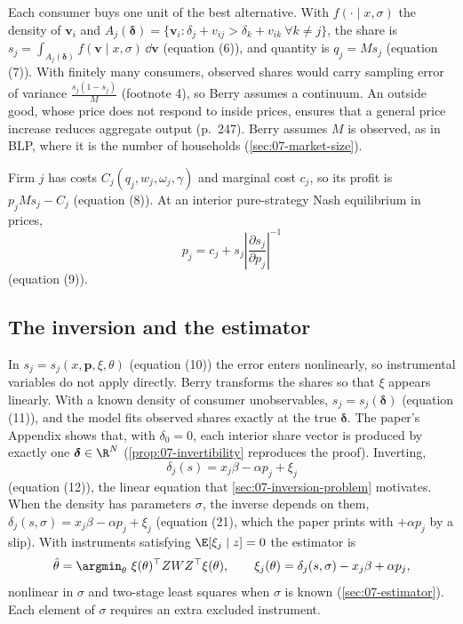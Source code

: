 Each consumer buys one unit of the best alternative. With $f(\cdot \mid x, \sigma)$ the density of
$\boldsymbol v_i$ and $A_j(\boldsymbol\delta) = \{\boldsymbol v_i : \delta_j + v_{ij} > \delta_k + v_{ik}\ \forall
k \ne j\}$, the share is $s_j = \int_{A_j(\boldsymbol\delta)} f(\boldsymbol v \mid x, \sigma)\,\dd\boldsymbol v$
(equation (6)), and quantity is $q_j = Ms_j$ (equation (7)). With finitely many consumers, observed shares
would carry sampling error of variance $\frac{s_j(1-s_j)}{M}$ (footnote 4), so Berry assumes a continuum. An
outside good, whose price does not respond to inside prices, ensures that a general price increase reduces
aggregate output (p.~247). Berry assumes $M$ is observed, as in BLP, where it is the number of households
(\cref{sec:07-market-size}).

Firm $j$ has costs $C_j(q_j, w_j, \omega_j, \gamma)$ and marginal cost $c_j$, so its profit is $p_jMs_j - C_j$
(equation (8)). At an interior pure-strategy Nash equilibrium in prices,
\begin{equation}\label{eq:07-berry-foc}
p_j = c_j + s_j\left|\frac{\partial s_j}{\partial p_j}\right|^{-1}
\end{equation}
(equation (9)).

\subsection{The inversion and the estimator}\label{sec:07-berry-inversion}

In $s_j = s_j(x, \boldsymbol p, \xi, \theta)$ (equation (10)) the error enters nonlinearly, so instrumental
variables do not apply directly. Berry transforms the shares so that $\xi$ appears linearly. With a known density
of consumer unobservables, $s_j = s_j(\boldsymbol\delta)$ (equation (11)), and the model fits observed shares
exactly at the true $\boldsymbol\delta$. The paper's Appendix shows that, with $\delta_0 = 0$, each interior share
vector is produced by exactly one $\boldsymbol\delta \in \R^N$ (\cref{prop:07-invertibility} reproduces the proof).
Inverting,
\begin{equation}\label{eq:07-berry-eq12}
\delta_j(s) = x_j\beta - \alpha p_j + \xi_j
\end{equation}
(equation (12)), the linear equation that \cref{sec:07-inversion-problem} motivates. When the density has
parameters $\sigma$, the
inverse depends on them, $\delta_j(s, \sigma) = x_j\beta - \alpha p_j + \xi_j$ (equation (21), which the paper
prints with $+\alpha p_j$ by a slip). With instruments satisfying $\E[\xi_j \mid z] = 0$ the estimator is
\begin{equation}\label{eq:07-berry-gmm}
\hat\theta = \argmin_{\theta}\ \xi(\theta)^\top Z W Z^\top \xi(\theta),
\qquad
\xi_j(\theta) = \delta_j(s, \sigma) - x_j\beta + \alpha p_j ,
\end{equation}
nonlinear in $\sigma$ \citep{Hansen1982} and two-stage least squares when $\sigma$ is known
(\cref{sec:07-estimator}). Each element of $\sigma$ requires an extra excluded instrument.

